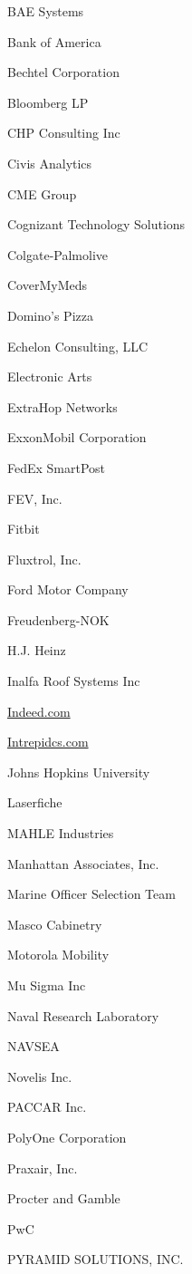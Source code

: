 \documentclass[twoside]{article}
\begin{document}
\begin{center}
\begin{multicols}{5}
\begin{FlushLeft}
\begin{compactitem}
\item BAE Systems
\item Bank of America
\item Bechtel Corporation
\item Bloomberg LP
\item CHP Consulting Inc
\item Civis Analytics
\item CME Group
\item Cognizant Technology Solutions
\item Colgate-Palmolive
\item CoverMyMeds
\item Domino's Pizza
\item Echelon Consulting, LLC
\item Electronic Arts
\item ExtraHop Networks
\item ExxonMobil Corporation
\item FedEx SmartPost
\item FEV, Inc.
\item Fitbit
\item Fluxtrol, Inc.
\item Ford Motor Company
\item Freudenberg-NOK
\item H.J. Heinz
\item Inalfa Roof Systems Inc
\item \url{Indeed.com}
\item \url{Intrepidcs.com}
\item Johns Hopkins University
\item Laserfiche
\item MAHLE Industries
\item Manhattan Associates, Inc.
\item Marine Officer Selection Team
\item Masco Cabinetry
\item Motorola Mobility
\item Mu Sigma Inc
\item Naval Research Laboratory
\item NAVSEA
\item Novelis Inc.
\item PACCAR Inc.
\item PolyOne Corporation
\item Praxair, Inc.
\item Procter and Gamble
\item PwC
\item PYRAMID SOLUTIONS, INC.

\end{compactitem}
\end{FlushLeft}
\end{multicols}
\end{center}
\end{document}

